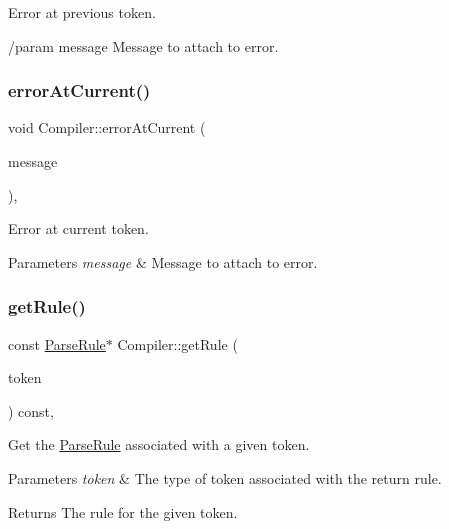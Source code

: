 Error at previous token. 

/param message Message to attach to error. \mbox{\label{class_compiler_a82a0fa92a3cd417321192dc92ff70e63}} 
\subsubsection{\texorpdfstring{error\+At\+Current()}{errorAtCurrent()}}
{\footnotesize\ttfamily void Compiler\+::error\+At\+Current (\begin{DoxyParamCaption}\item[{const char $\ast$}]{message }\end{DoxyParamCaption})\hspace{0.3cm}{\ttfamily [inline]}, {\ttfamily [private]}}



Error at current token. 


\begin{DoxyParams}{Parameters}
{\em message} & Message to attach to error. \\
\hline
\end{DoxyParams}
\mbox{\label{class_compiler_ad534a120c4dc283f635dc085afd94560}} 
\subsubsection{\texorpdfstring{get\+Rule()}{getRule()}}
{\footnotesize\ttfamily const \hyperlink{struct_compiler_1_1_parse_rule}{Parse\+Rule}$\ast$ Compiler\+::get\+Rule (\begin{DoxyParamCaption}\item[{\hyperlink{_scanner_8h_aa520fbf142ba1e7e659590c07da31921}{Token\+Type}}]{token }\end{DoxyParamCaption}) const\hspace{0.3cm}{\ttfamily [inline]}, {\ttfamily [private]}}



Get the \hyperlink{struct_compiler_1_1_parse_rule}{Parse\+Rule} associated with a given token. 


\begin{DoxyParams}{Parameters}
{\em token} & The type of token associated with the return rule. \\
\hline
\end{DoxyParams}
\begin{DoxyReturn}{Returns}
The rule for the given token. 
\end{DoxyReturn}
\mbox{\label{class_compiler_aca18f596319bb5dc49e36130c875ddae}} 
